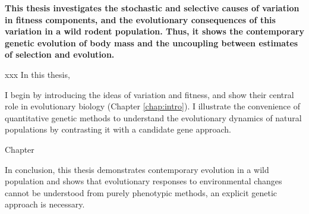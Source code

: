 \begin{summary}
\textbf{
This thesis investigates the stochastic and selective causes of variation in fitness components, and the evolutionary consequences of this variation in a wild rodent population. 
Thus, it shows the contemporary genetic evolution of body mass and the uncoupling between estimates of selection and evolution. 
}

xxx
In this thesis, 

I begin by introducing the ideas of variation and fitness, and show their central role in evolutionary biology (Chapter \ref{chap:intro}). I illustrate the convenience of quantitative genetic methods to understand the evolutionary dynamics of natural populations by contrasting it with a candidate gene approach.
 

Chapter 

In conclusion, this thesis demonstrates contemporary evolution in a wild population and shows that evolutionary responses to environmental changes cannot be understood from purely phenotypic methods, an explicit genetic approach is necessary. 

\end{summary}
